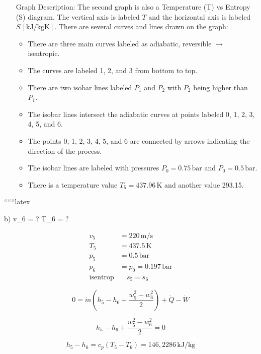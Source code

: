 \begin{itemize}
    \item[Graph Description:] 
    The second graph is also a Temperature (T) vs Entropy (S) diagram. The vertical axis is labeled \( T \) and the horizontal axis is labeled \( S \, [\text{kJ}/\text{kgK}] \). There are several curves and lines drawn on the graph:
    \begin{itemize}
        \item There are three main curves labeled as adiabatic, reversible \(\rightarrow\) isentropic.
        \item The curves are labeled 1, 2, and 3 from bottom to top.
        \item There are two isobar lines labeled \( P_1 \) and \( P_2 \) with \( P_2 \) being higher than \( P_1 \).
        \item The isobar lines intersect the adiabatic curves at points labeled 0, 1, 2, 3, 4, 5, and 6.
        \item The points 0, 1, 2, 3, 4, 5, and 6 are connected by arrows indicating the direction of the process.
        \item The isobar lines are labeled with pressures \( P_0 = 0.75 \, \text{bar} \) and \( P_0 = 0.5 \, \text{bar} \).
        \item There is a temperature value \( T_5 = 437.96 \, \text{K} \) and another value 293.15.
    \end{itemize}
\end{itemize}

``````latex

b) \quad v_6 = ? \quad T_6 = ? 

\[
\begin{aligned}
v_5 &= 220 \, \text{m/s} \\
T_5 &= 437.5 \, \text{K} \\
p_5 &= 0.5 \, \text{bar} \\
p_6 &= p_0 = 0.197 \, \text{bar} \\
\text{isentrop} & \quad s_5 = s_6
\end{aligned}
\]


\[
0 = \dot{m} \left( h_5 - h_6 + \frac{w_5^2 - w_6^2}{2} \right) + \dot{Q} - \dot{W}
\]

 \quad {}

\[
h_5 - h_6 + \frac{w_5^2 - w_6^2}{2} = 0
\]

\[
h_5 - h_6 = c_p (T_5 - T_6) = 146,2286 \, \text{kJ/kg}
\]

